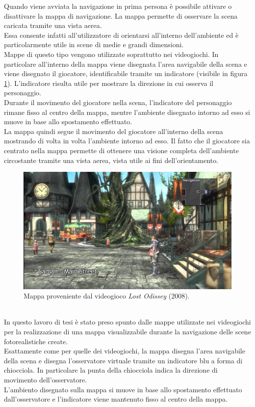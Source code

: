Quando viene avviata la navigazione in prima persona è possibile attivare o disattivare la mappa di navigazione.
La mappa permette di osservare la scena caricata tramite una vista aerea.
\\
Essa consente infatti all’utilizzatore di orientarsi all’interno dell’ambiente ed è particolarmente utile in scene di medie e grandi dimensioni.
\\
Mappe di questo tipo vengono utilizzate soprattutto nei videogiochi.
In particolare all’interno della mappa viene disegnata l’area navigabile della scena e viene disegnato il giocatore, identificabile tramite un indicatore (visibile in figura \ref{fig:navigazione_scena_map_lost_odissey}). 
L’indicatore risulta utile per mostrare la direzione in cui osserva il personaggio.
\\
Durante il movimento del giocatore nella scena, l’indicatore del personaggio rimane fisso al centro della mappa, mentre l’ambiente disegnato intorno ad esso si muove in base allo spostamento effettuato.
\\
La mappa quindi segue il movimento del giocatore all’interno della scena mostrando di volta in volta l’ambiente intorno ad esso. 
Il fatto che il giocatore sia centrato nella mappa permette di ottenere una visione completa dell’ambiente circostante tramite una vista aerea, vista utile ai fini dell’orientamento.
\\
\begin{figure}[htb]
 \centering
 \includegraphics[width=1\linewidth]{images/chapter_navigazione_scena/map_lost_odissey.jpg}\hfill
 \caption[Mappe nei videogiochi.]{Mappa proveniente dal videogioco \emph{Lost Odissey} (2008).}
 \label{fig:navigazione_scena_map_lost_odissey}
\end{figure}
\\
In questo lavoro di tesi è stato preso spunto dalle mappe utilizzate nei videogiochi per la realizzazione di una mappa visualizzabile durante la navigazione delle scene fotorealistiche create.
\\
Esattamente come per quelle dei videogiochi, la mappa disegna l’area navigabile della scena e disegna l’osservatore virtuale tramite un indicatore blu a forma di chiocciola. In particolare la punta della chiocciola indica la direzione di movimento dell’osservatore.
\\
L’ambiento disegnato sulla mappa si muove in base allo spostamento effettuato dall’osservatore e l’indicatore viene mantenuto fisso al centro della mappa.
\\

